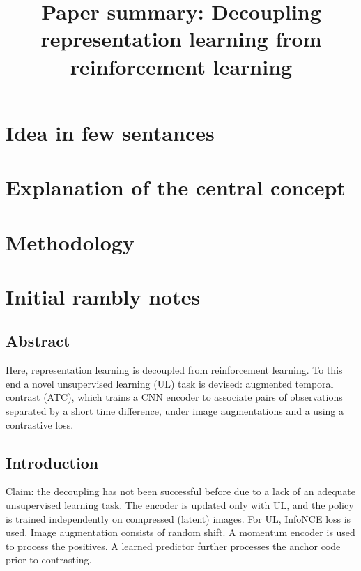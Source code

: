\documentclass{article}
\title{Paper summary: Decoupling representation learning from reinforcement learning}
\begin{document}
\maketitle


\section{Idea in few sentances}



\section{Explanation of the central concept}




\section{Methodology}


\section{Initial rambly notes}


\subsection{Abstract}
Here, representation learning is decoupled from reinforcement learning.
To this end a novel unsupervised learning (UL) task is devised: augmented temporal contrast (ATC),
which trains a CNN encoder to associate pairs of observations separated by a short time difference, under image 
augmentations and a using a contrastive loss.

\subsection{Introduction}
Claim: the decoupling has not been successful before due to a lack of an adequate unsupervised learning task.
The encoder is updated only with UL,
and the policy is trained independently on compressed (latent) images.
For UL, InfoNCE loss is used.
Image augmentation consists of random shift. A momentum encoder is used to process the positives.
A learned predictor further processes the anchor code prior to contrasting.
\end{document}
